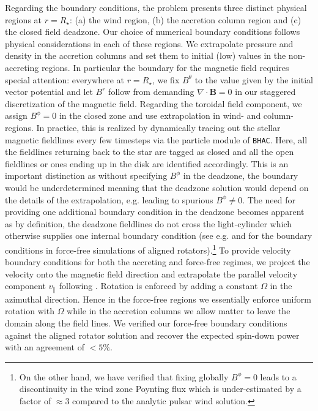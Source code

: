 \documentclass[fleqn,usenatbib]{mnras}
\newcommand{\rstar}{\ensuremath{R_{\star}}}
\newcommand{\bhac}{\texttt{BHAC}\xspace}
\begin{document}
Regarding the boundary conditions, the problem presents three distinct physical regions at $r=\rstar$: (a) the wind region, (b) the accretion column region and (c) the closed field deadzone.  Our choice of numerical boundary conditions follows physical considerations in each of these regions.  
We extrapolate pressure and density in the accretion columns and set them to initial (low) values in the non-accreting regions. 
In particular the boundary for the magnetic field requires special attention:  everywhere at $r=\rstar$, we fix $B^{\theta}$ to the value given by the initial vector potential and let $B^r$ follow from demanding $\nabla \cdot \mathbf{B}=0$ in our staggered discretization of the magnetic field.  
Regarding the toroidal field component, we assign $B^{\phi} = 0$ in the closed zone and use extrapolation in wind- and column- regions. In practice, this is realized by dynamically tracing out the stellar magnetic fieldlines every few timesteps via the particle module of \bhac.  Here, all the fieldlines returning back to the star are tagged as closed and all the open fieldlines or ones ending up in the disk are identified accordingly.  
This is an important distinction as without specifying $B^\phi$ in the deadzone, the boundary would be underdetermined meaning that the deadzone solution would depend on the details of the  extrapolation, e.g. leading to spurious $B^\phi\ne 0$.  The need for providing one additional boundary condition in the deadzone becomes apparent as by definition, the deadzone fieldlines do not cross the light-cylinder which otherwise supplies one internal boundary condition (see e.g. \citealt{Bogovalov1997fixed,Porth2010} and \cite{McKinney2006c} for the boundary conditions in force-free simulations of aligned rotators).\footnote{On the other hand, we have verified that fixing globally $B^\phi=0$ leads to a discontinuity in the wind zone Poynting flux which is under-estimated by a factor of $\approx3$ compared to the analytic pulsar wind solution.}  
To provide velocity boundary conditions for both the accreting and force-free regimes, we project the velocity onto the magnetic field direction and extrapolate the parallel velocity component $v_{\|}$ following .  Rotation is enforced by adding a constant $\Omega$ in the azimuthal direction.  Hence in the force-free regions we essentially enforce uniform rotation with $\Omega$ while in the accretion columns we allow matter to leave the domain along the field lines. We verified our force-free boundary conditions against the aligned rotator solution \citep[e.g.][]{Gruzinov1999,McKinney2006c} and recover the expected spin-down power with an agreement of $<5\%$.
\end{document}
